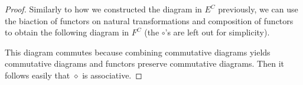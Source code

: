 \documentclass{article}
\theoremstyle{definition}
\theoremstyle{remark}
\begin{document}
\begin{proof}
	Similarly to how we constructed the diagram in $E^C$ previously, we can use the biaction of functors on natural transformations and composition of functors to obtain the following diagram in $F^C$ (the $\circ$'s are left out for simplicity).
	\begin{figure}[H]
		\centering
	\end{figure}
	
	This diagram commutes because combining commutative diagrams yields commutative diagrams and functors preserve commutative diagrams. Then it follows easily that $\diamond$ is associative.
\end{proof}
\end{document}
